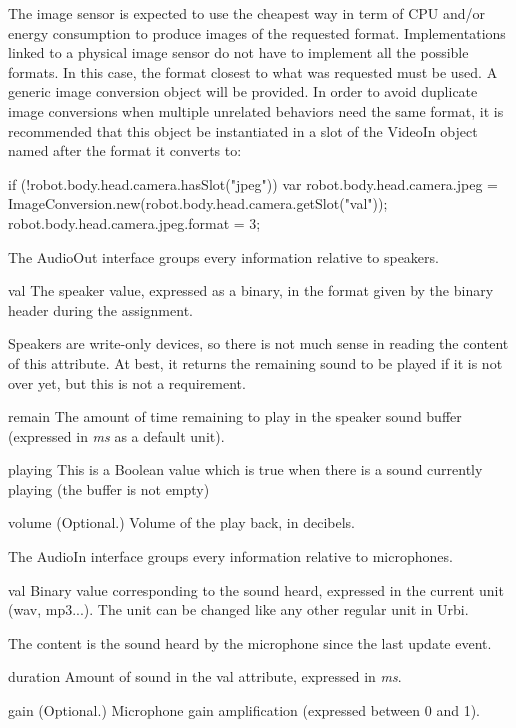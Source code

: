 The image sensor is expected to use the cheapest way in term of CPU and/or
energy consumption to produce images of the requested format.
Implementations linked to a physical image sensor do not have to implement
all the possible formats. In this case, the format closest to what was
requested must be used.  A generic image conversion object will be
provided. In order to avoid duplicate image conversions when multiple
unrelated behaviors need the same format, it is recommended that this object
be instantiated in a slot of the VideoIn object named after the format it
converts to:
\begin{urbiunchecked}
if (!robot.body.head.camera.hasSlot("jpeg"))
{
  var robot.body.head.camera.jpeg =
    ImageConversion.new(robot.body.head.camera.getSlot("val"));
  robot.body.head.camera.jpeg.format = 3;
}
\end{urbiunchecked}

The AudioOut interface groups every information relative to speakers.

\begin{urbiscriptapi}
\item[val] The speaker value, expressed as a binary, in the format given by
  the binary header during the assignment.

  Speakers are write-only devices, so there is not much sense in reading the
  content of this attribute. At best, it returns the remaining sound to be
  played if it is not over yet, but this is not a requirement.


\item[remain] The amount of time remaining to play in the speaker sound
  buffer (expressed in \textit{ms} as a default unit).


\item[playing] This is a Boolean value which is true when there is a sound
  currently playing (the buffer is not empty)%

\item[volume] (Optional.) Volume of the play back, in decibels.
\end{urbiscriptapi}




The AudioIn interface groups every information relative to microphones.

\begin{urbiscriptapi}
\item[val] Binary value corresponding to the sound heard, expressed in the
  current unit (wav, mp3...). The unit can be changed like any other regular
  unit in Urbi.

  The content is the sound heard by the microphone since the last update
  event.
\item[duration] Amount of sound in the val attribute, expressed in
  \textit{ms}.
\item[gain] (Optional.) Microphone gain amplification (expressed between 0
  and 1).
\end{urbiscriptapi}


